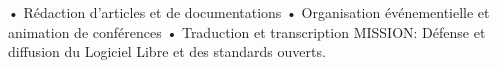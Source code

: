 \documentclass[
	a4paper,
	maincolor=re,
	sidecolor=bg-2,
	sidetextcolor=tex-3,
	sectioncolor=re,
	subsectioncolor=tex-2,
	itemtextcolor=tex-3,
	profilepicsize=3.5cm,
	profilepicborderwidth=2pt,
]{fortysecondscv}
\begin{document}
\begin{cvtable}[2.5]
    {
        • Rédaction d’articles et de documentations\newline
        • Organisation événementielle et animation de conférences\newline
        • Traduction et transcription\newline
        MISSION: Défense et diffusion du Logiciel Libre et des standards 
        ouverts.\newline
    }
\end{cvtable}
\end{document}
